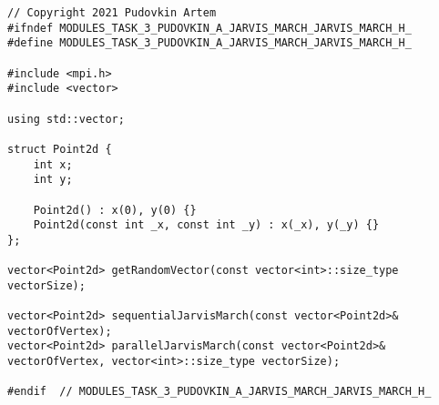\documentclass{report}
\begin{document}
\begin{lstlisting}
// Copyright 2021 Pudovkin Artem
#ifndef MODULES_TASK_3_PUDOVKIN_A_JARVIS_MARCH_JARVIS_MARCH_H_
#define MODULES_TASK_3_PUDOVKIN_A_JARVIS_MARCH_JARVIS_MARCH_H_

#include <mpi.h>
#include <vector>

using std::vector;

struct Point2d {
    int x;
    int y;

    Point2d() : x(0), y(0) {}
    Point2d(const int _x, const int _y) : x(_x), y(_y) {}
};

vector<Point2d> getRandomVector(const vector<int>::size_type vectorSize);

vector<Point2d> sequentialJarvisMarch(const vector<Point2d>& vectorOfVertex);
vector<Point2d> parallelJarvisMarch(const vector<Point2d>& vectorOfVertex, vector<int>::size_type vectorSize);

#endif  // MODULES_TASK_3_PUDOVKIN_A_JARVIS_MARCH_JARVIS_MARCH_H_

\end{lstlisting}
\end{document}
